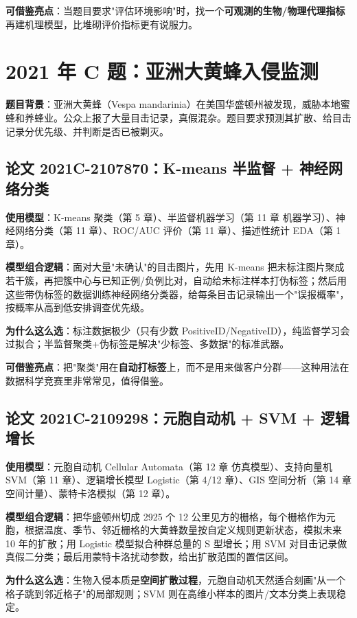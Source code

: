 \textbf{可借鉴亮点}：当题目要求"评估环境影响"时，找一个\textbf{可观测的生物/物理代理指标}再建机理模型，比堆砌评价指标更有说服力。

\section{2021 年 C 题：亚洲大黄蜂入侵监测}

\textbf{题目背景}：亚洲大黄蜂（Vespa mandarinia）在美国华盛顿州被发现，威胁本地蜜蜂和养蜂业。公众上报了大量目击记录，真假混杂。题目要求预测其扩散、给目击记录分优先级、并判断是否已被剿灭。

\subsection{论文 2021C-2107870：K-means 半监督 + 神经网络分类}
\textbf{使用模型}：K-means 聚类（第 5 章）、半监督机器学习（第 11 章 机器学习）、神经网络分类（第 11 章）、ROC/AUC 评价（第 11 章）、描述性统计 EDA（第 1 章）。

\textbf{模型组合逻辑}：面对大量"未确认"的目击图片，先用 K-means 把未标注图片聚成若干簇，再把簇中心与已知正例/负例比对，自动给未标注样本打伪标签；然后用这些带伪标签的数据训练神经网络分类器，给每条目击记录输出一个"误报概率"，按概率从高到低安排调查优先级。

\textbf{为什么这么选}：标注数据极少（只有少数 PositiveID/NegativeID），纯监督学习会过拟合；半监督聚类+伪标签是解决"少标签、多数据"的标准武器。

\textbf{可借鉴亮点}：把"聚类"用在\textbf{自动打标签}上，而不是用来做客户分群——这种用法在数据科学竞赛里非常常见，值得借鉴。

\subsection{论文 2021C-2109298：元胞自动机 + SVM + 逻辑增长}
\textbf{使用模型}：元胞自动机 Cellular Automata（第 12 章 仿真模型）、支持向量机 SVM（第 11 章）、逻辑增长模型 Logistic（第 4/12 章）、GIS 空间分析（第 14 章 空间计量）、蒙特卡洛模拟（第 12 章）。

\textbf{模型组合逻辑}：把华盛顿州切成 2925 个 12 公里见方的栅格，每个栅格作为元胞，根据温度、季节、邻近栅格的大黄蜂数量按自定义规则更新状态，模拟未来 10 年的扩散；用 Logistic 模型拟合种群总量的 S 型增长；用 SVM 对目击记录做真假二分类；最后用蒙特卡洛扰动参数，给出扩散范围的置信区间。

\textbf{为什么这么选}：生物入侵本质是\textbf{空间扩散过程}，元胞自动机天然适合刻画"从一个格子跳到邻近格子"的局部规则；SVM 则在高维小样本的图片/文本分类上表现稳定。

